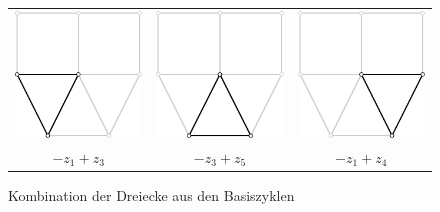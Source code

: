 \begin{figure}
\begin{center}
\begin{tabular}{ccc}
\includegraphics[width=0.17\hsize]{images/kirchhoff-11}&
\includegraphics[width=0.17\hsize]{images/kirchhoff-12}&
\includegraphics[width=0.17\hsize]{images/kirchhoff-13}\\
$-z_1+z_3$&
$-z_3+z_5$&
$-z_1+z_4$
\end{tabular}
\end{center}
\caption{Kombination der Dreiecke aus den Basiszyklen\label{dreiecke}}
\end{figure}

